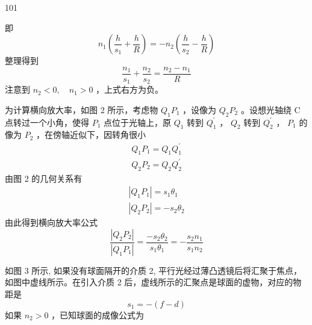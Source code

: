 \begin{solution}{101}
\begin{subsolution}
\begin{equation*}
        \end{equation*}
        即
        \begin{equation}
            n _ {1} \left(\frac {h}{s _ {1}} + \frac {h}{R}\right) = - n _ {2} \left(\frac {h}{s _ {2}} - \frac {h}{R}\right)
            \label{eq:8.p101}
        \end{equation}
        整理得到
        \begin{equation}
            \frac {n _ {1}}{s _ {1}} + \frac {n _ {2}}{s _ {2}} = \frac {n _ {2} - n _ {1}}{R}
            \label{eq:9.p101}
        \end{equation}
        注意到 $n_{2}<0,\quad n_{1}>0$ ，上式右方为负。

        为计算横向放大率，如图 2 所示，考虑物 $Q_{1}P_{1}$ ，设像为 $Q_{2}P_{2}$ 。设想光轴绕 C 点转过一个小角，使得 $P_{1}$ 点位于光轴上，原 $Q_{1}$ 转到 $Q_{1}^{\prime}$ ， $Q_{2}$ 转到 $Q_{2}^{\prime}$ ， $P_{1}$ 的像为 $P_{2}$ ，在傍轴近似下，因转角很小
        \begin{align}
            Q _ {1} P _ {1} = Q _ {1} Q _ {1} ^ {\prime} \\
            Q _ {2} P _ {2} = Q _ {2} Q _ {2} ^ {\prime}
            \label{eq:10.p101}
        \end{align}
        由图 2 的几何关系有
        \begin{align}
            \left| Q _ {1} P _ {1} \right| = s _ {1} \theta_ {1} \\
            \left| Q _ {2} P _ {2} \right| = - s _ {2} \theta_ {2}
            \label{eq:12.p101}
        \end{align}
        由此得到横向放大率公式
        \begin{equation}
            \frac {\left| Q _ {2} P _ {2} \right|}{\left| Q _ {1} P _ {1} \right|} = \frac {- s _ {2} \theta_ {2}}{s _ {1} \theta_ {1}} = - \frac {s _ {2} n _ {1}}{s _ {1} n _ {2}}
            \label{eq:13.p101}
        \end{equation}
    \end{subsolution}
    \begin{subsolution}
        如图 3 所示, 如果没有球面隔开的介质 2, 平行光经过薄凸透镜后将汇聚于焦点，如图中虚线所示。在引入介质 2 后，虚线所示的汇聚点是球面的虚物，对应的物距是
        \begin{equation}
            s _ {1} = - (f - d)
            \label{eq:14.p101}
        \end{equation}
        如果 $n_2 > 0$ ，已知球面的成像公式为
        \begin{equation}

\end{equation}
\end{subsolution}
\end{solution}
